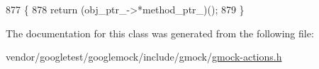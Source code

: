 \begin{DoxyCode}
877                                              \{
878     \textcolor{keywordflow}{return} (obj\_ptr\_->*method\_ptr\_)();
879   \}
\end{DoxyCode}


The documentation for this class was generated from the following file\+:\begin{DoxyCompactItemize}
\item 
vendor/googletest/googlemock/include/gmock/\hyperlink{gmock-actions_8h}{gmock-\/actions.\+h}\end{DoxyCompactItemize}
